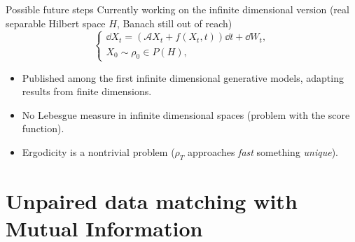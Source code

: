 \begin{frame}{Possible future steps}
Currently working on the infinite dimensional version (real separable Hilbert space $H$, Banach still out of reach)
\begin{equation}\label{eq:diffsde}
    \begin{cases}
    \dd X_t=\left(\mathcal{A}X_t+f(X_t,t)\right)\dd t+ \dd W_t,\\
    X_0\sim \rho_0\in P(H),%
    \end{cases}
\end{equation}
\begin{itemize}
    \item Published among the first infinite dimensional generative models, adapting results from finite dimensions.
    \item No Lebesgue measure in infinite dimensional spaces (problem with the score function).
    \item Ergodicity is a nontrivial problem ($\rho_T$ approaches \textit{fast} something \textit{unique}).
\end{itemize}

    
\end{frame}

\section{Unpaired data matching with Mutual Information}


